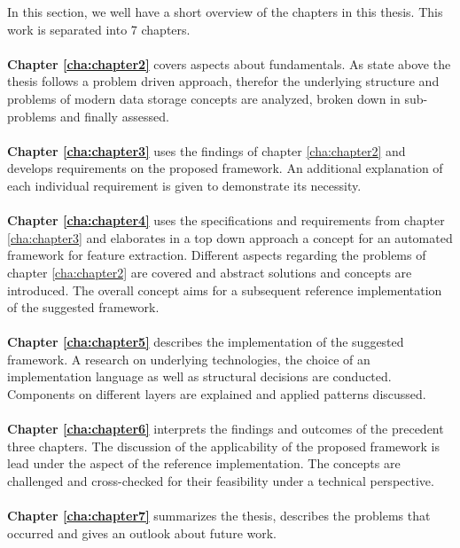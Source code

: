 In this section, we well have a short overview of the chapters in this thesis. This work is separated into 7 chapters.
\\\\
\textbf{Chapter \ref{cha:chapter2}} covers aspects about fundamentals. As state above the thesis follows a problem driven approach, therefor the underlying structure and problems of modern data storage concepts are analyzed, broken down in sub-problems and finally assessed.
\\\\
\textbf{Chapter \ref{cha:chapter3}} uses the findings of chapter \ref{cha:chapter2} and develops requirements on the proposed framework. An additional explanation of each individual requirement is given to demonstrate its necessity.
\\\\
\textbf{Chapter \ref{cha:chapter4}} uses the specifications and requirements from chapter \ref{cha:chapter3} and elaborates in a top down approach a concept for an automated framework for feature extraction. Different aspects regarding the problems of chapter \ref{cha:chapter2} are covered and abstract solutions and concepts are introduced. The overall concept aims for a subsequent reference implementation of the suggested framework.
\\\\
\textbf{Chapter \ref{cha:chapter5}} describes the implementation of the suggested framework. A research on underlying technologies, the choice of an implementation language as well as structural decisions are conducted. Components on different layers are explained and applied patterns discussed. 
\\\\
\textbf{Chapter \ref{cha:chapter6}} interprets the findings and outcomes of the precedent three chapters. The discussion of the applicability of the proposed framework is lead under the aspect of the reference implementation. The concepts are challenged and cross-checked for their feasibility under a technical perspective.
\\\\
\textbf{Chapter \ref{cha:chapter7}} summarizes the thesis, describes the problems that occurred and gives an outlook about future work.
